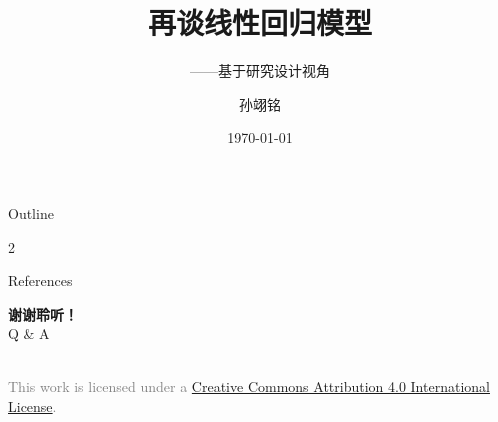 \documentclass[aspectratio=169]{beamer}
\title{再谈线性回归模型}
\subtitle{——基于研究设计视角\parencite{GLSJ202510012}}
\author[孙翊铭]{孙翊铭}
\institute[吉林大学]{吉林大学经济学院}
\date{\today}
\begin{document}
\begin{frame}
  \titlepage
\end{frame}

\begin{frame}{Outline}
  \begin{multicols}{2}
    \tableofcontents
  \end{multicols}
\end{frame}







\begin{frame}{References}
  \printbibliography
\end{frame}

\begin{frame}
  \vspace*{\fill}
  \begin{center}
    {\Huge \textbf{谢谢聆听！}} \\[1em]
    {\large Q \& A}
  \end{center}
  \vspace*{\fill}
  
  \begin{center}
    \tiny \textcolor{gray}{
      \ccby \\ %
      This work is licensed under a \href{https://creativecommons.org/licenses/by/4.0/}{Creative Commons Attribution 4.0 International License}.
    }
  \end{center}
\end{frame}
\end{document}
